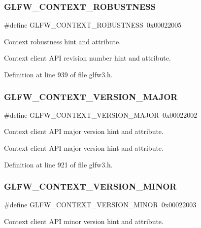 \subsubsection{\texorpdfstring{GLFW\_CONTEXT\_ROBUSTNESS}{GLFW\_CONTEXT\_ROBUSTNESS}}
{\footnotesize\ttfamily \#define G\+L\+F\+W\+\_\+\+C\+O\+N\+T\+E\+X\+T\+\_\+\+R\+O\+B\+U\+S\+T\+N\+E\+SS~0x00022005}



Context robustness hint and attribute. 

Context client A\+PI revision number hint and attribute. 

Definition at line 939 of file glfw3.\+h.

\mbox{\label{group__window_gafe5e4922de1f9932d7e9849bb053b0c0}} 
\subsubsection{\texorpdfstring{GLFW\_CONTEXT\_VERSION\_MAJOR}{GLFW\_CONTEXT\_VERSION\_MAJOR}}
{\footnotesize\ttfamily \#define G\+L\+F\+W\+\_\+\+C\+O\+N\+T\+E\+X\+T\+\_\+\+V\+E\+R\+S\+I\+O\+N\+\_\+\+M\+A\+J\+OR~0x00022002}



Context client A\+PI major version hint and attribute. 

Context client A\+PI major version hint and attribute. 

Definition at line 921 of file glfw3.\+h.

\mbox{\label{group__window_ga31aca791e4b538c4e4a771eb95cc2d07}} 
\subsubsection{\texorpdfstring{GLFW\_CONTEXT\_VERSION\_MINOR}{GLFW\_CONTEXT\_VERSION\_MINOR}}
{\footnotesize\ttfamily \#define G\+L\+F\+W\+\_\+\+C\+O\+N\+T\+E\+X\+T\+\_\+\+V\+E\+R\+S\+I\+O\+N\+\_\+\+M\+I\+N\+OR~0x00022003}



Context client A\+PI minor version hint and attribute. 

